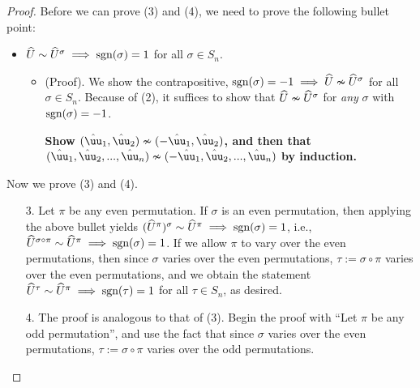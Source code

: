 \begin{proof}
    Before we can prove (3) and (4), we need to prove the following bullet point:

    \begin{itemize}
        \item $\widehat{U} \sim \widehat{U}^\sigma \implies \text{sgn}(\sigma) = 1$ for all $\sigma \in S_n$.
        \begin{itemize}
            \item (Proof). We show the contrapositive, $\text{sgn}(\sigma) = -1 \implies \widehat{U} \nsim \widehat{U}^\sigma$ for all $\sigma \in S_n$. Because of (2), it suffices to show that $\widehat{U} \nsim \widehat{U}^\sigma$ for \textit{any} $\sigma$ with $\text{sgn}(\sigma) = -1$.

            \textbf{Show $(\huu_1, \huu_2) \nsim (-\huu_1, \huu_2)$, and then that $(\huu_1, \huu_2, ..., \huu_n) \nsim (-\huu_1, \huu_2, ..., \huu_n)$ by induction.}
        \end{itemize}
    \end{itemize}

    Now we prove (3) and (4).
    
    \begin{enumerate}
        \item[3.] Let $\pi$ be any even permutation. If $\sigma$ is an even permutation, then applying the above bullet yields $(\widehat{U}^\pi)^\sigma \sim \widehat{U}^\pi \implies \text{sgn}(\sigma) = 1$, i.e., $\widehat{U}^{\sigma \circ \pi} \sim \widehat{U}^\pi \implies \text{sgn}(\sigma) = 1$. If we allow $\pi$ to vary over the even permutations, then since $\sigma$ varies over the even permutations, $\tau := \sigma \circ \pi$ varies over the even permutations, and we obtain the statement $\widehat{U}^\tau \sim \widehat{U}^\pi \implies \text{sgn}(\tau) = 1$ for all $\tau \in S_n$, as desired.
        \item[4.] The proof is analogous to that of (3). Begin the proof with ``Let $\pi$ be any odd permutation'', and use the fact that since $\sigma$ varies over the even permutations, $\tau := \sigma \circ \pi$ varies over the odd permutations.
    \end{enumerate}
\end{proof}

